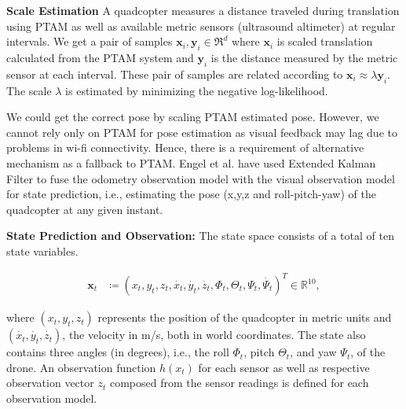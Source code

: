 \textbf{Scale Estimation}
A quadcopter measures a distance traveled during translation using PTAM as well
as available metric sensors (ultrasound altimeter) at regular intervals. We get
a pair of samples $\mathbf{x}_i, \mathbf{y}_i \in {\Re}^d$ where $\mathbf{x}_i$ is
scaled translation calculated from the PTAM system and $\mathbf{y}_i$ is the
distance measured by the metric sensor at each interval. These pair of samples are related
according to $\mathbf{x}_i \approx \lambda \mathbf{y}_i$. The scale $\lambda$ is
estimated by minimizing the negative log-likelihood\cite{engel}.  

We could get the correct pose by  scaling  PTAM estimated pose. However, we
cannot rely only on PTAM for pose estimation as visual feedback may lag due to
problems in wi-fi connectivity. Hence, there is a requirement of  alternative
mechanism as a fallback to PTAM. Engel et al. \cite{engel} have used Extended
Kalman Filter to fuse the odometry observation model with the visual observation
model for state prediction, i.e., estimating the pose (x,y,z and roll-pitch-yaw) of 
the quadcopter at any given instant.

\textbf{State Prediction and Observation:} The state space consists of a total
of ten state variables. 
\begin{ceqn}
\begin{align}
	\mathbf{x}_t &\coloneqq {(x_t, y_t, z_t, \dot{x_t}, \dot{y_t},
	\dot{z_t}, {\Phi}_t, {\Theta}_t, {\Psi}_t, \dot{{\Psi}_t} )}^T  \in
	{\mathbb{R}}^{10},
\end{align}
\end{ceqn}
where $(x_t, y_t, z_t)$ represents the position of the quadcopter in
metric units and $(\dot{x_t}, \dot{y_t}, \dot{z_t})$, the velocity in m/s, both
in world coordinates. The state also contains three angles (in degrees), i.e.,
the roll ${\Phi}_t$, pitch ${\Theta}_t$, and yaw ${\Psi}_t$, of the drone. 
An observation function $h(x_t)$ for each sensor as well as respective observation vector $z_t$
composed from the sensor readings is defined for each observation model.

